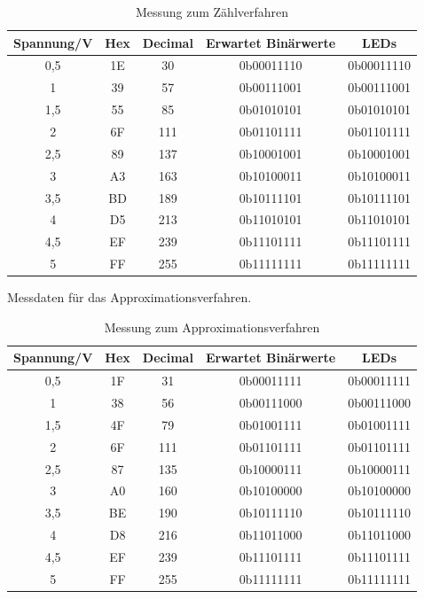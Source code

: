\documentclass[12pt,a4paper]{article}
\begin{document}
\begin{table}[htbp]
\begin{center}
\begin{tabular}{|c|c|c|c|c|}
\hline
\multicolumn{1}{|l|}{Spannung/V} & Hex & \multicolumn{1}{l|}{Decimal} & \multicolumn{1}{l|}{Erwartet Binärwerte} & LEDs \\ \hline
0,5 & 1E & 30 & 0b00011110 & 0b00011110 \\ \hline
1 & 39 & 57 & 0b00111001 & 0b00111001 \\ \hline
1,5 & 55 & 85 & 0b01010101 & 0b01010101 \\ \hline
2 & 6F & 111 & 0b01101111 & 0b01101111 \\ \hline
2,5 & 89 & 137 & 0b10001001 & 0b10001001 \\ \hline
3 & A3 & 163 & 0b10100011 & 0b10100011 \\ \hline
3,5 & BD & 189 & 0b10111101 & 0b10111101 \\ \hline
4 & D5 & 213 & 0b11010101 & 0b11010101 \\ \hline
4,5 & EF & 239 & 0b11101111 & 0b11101111 \\ \hline
5 & FF & 255 & 0b11111111 & 0b11111111 \\ \hline
\end{tabular}
\end{center}
\caption{Messung zum Zählverfahren}
\label{tab:zaehl}
\end{table}

Messdaten für das Approximationsverfahren.

\begin{table}[htbp]
\begin{center}
\begin{tabular}{|c|c|c|c|c|}
\hline
\multicolumn{1}{|l|}{Spannung/V} & Hex & \multicolumn{1}{l|}{Decimal} & \multicolumn{1}{l|}{Erwartet Binärwerte} & LEDs \\ \hline
0,5 & 1F & 31 & 0b00011111 & 0b00011111 \\ \hline
1 & 38 & 56 & 0b00111000 & 0b00111000 \\ \hline
1,5 & 4F & 79 & 0b01001111 & 0b01001111 \\ \hline
2 & 6F & 111 & 0b01101111 & 0b01101111 \\ \hline
2,5 & 87 & 135 & 0b10000111 & 0b10000111 \\ \hline
3 & A0 & 160 & 0b10100000 & 0b10100000 \\ \hline
3,5 & BE & 190 & 0b10111110 & 0b10111110 \\ \hline
4 & D8 & 216 & 0b11011000 & 0b11011000 \\ \hline
4,5 & EF & 239 & 0b11101111 & 0b11101111 \\ \hline
5 & FF & 255 & 0b11111111 & 0b11111111 \\ \hline
\end{tabular}
\end{center}
\caption{Messung zum Approximationsverfahren}
\label{tab:approx}
\end{table}
\end{document}
